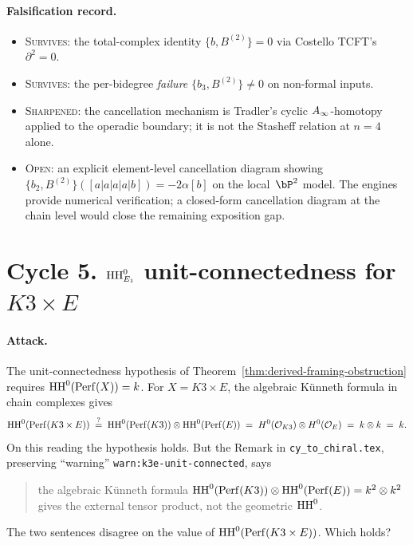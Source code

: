 \paragraph{Falsification record.}
\begin{itemize}
\item
\textsc{Survives}: the total-complex identity
$\{b, B^{(2)}\} = 0$ via Costello TCFT's $\partial^2 = 0$.

\item
\textsc{Survives}: the per-bidegree \emph{failure}
$\{b_3, B^{(2)}\} \neq 0$ on non-formal inputs.

\item
\textsc{Sharpened}: the cancellation mechanism is Tradler's
cyclic $A_\infty$-homotopy applied to the operadic boundary; it is
not the Stasheff relation at $n = 4$ alone.

\item
\textsc{Open}: an explicit element-level cancellation diagram
showing $\{b_2, B^{(2)}\}([a|a|a|a|b]) = -2\alpha [b]$ on the
local~$\bP^2$ model. The engines provide numerical verification;
a closed-form cancellation diagram at the chain level would
close the remaining exposition gap.
\end{itemize}

\section*{Cycle 5. $\mathrm{HH}^0_{E_1}$ unit-connectedness for $K3 \times E$}

\paragraph{Attack.} The unit-connectedness hypothesis of
Theorem~\ref{thm:derived-framing-obstruction} requires
$\mathrm{HH}^0(\mathrm{Perf}(X)) = k$. For $X = K3 \times E$, the
algebraic K\"unneth formula in chain complexes gives
\[
  \mathrm{HH}^0(\mathrm{Perf}(K3 \times E))
  \;\stackrel{?}{=}\;
  \mathrm{HH}^0(\mathrm{Perf}(K3)) \otimes \mathrm{HH}^0(\mathrm{Perf}(E))
  \;=\;
  H^0(\mathcal{O}_{K3}) \otimes H^0(\mathcal{O}_E)
  \;=\;
  k \otimes k \;=\; k.
\]
On this reading the hypothesis holds. But the Remark in
\texttt{cy\_to\_chiral.tex}, preserving ``warning''
\texttt{warn:k3e-unit-connected}, says
\begin{quote}
  the algebraic K\"unneth formula
  $\mathrm{HH}^0(\mathrm{Perf}(K3)) \otimes \mathrm{HH}^0(\mathrm{Perf}(E)) = k^2 \otimes k^2$
  gives the external tensor product, not the geometric $\mathrm{HH}^0$.
\end{quote}
The two sentences disagree on the value of
$\mathrm{HH}^0(\mathrm{Perf}(K3 \times E))$. Which holds?

